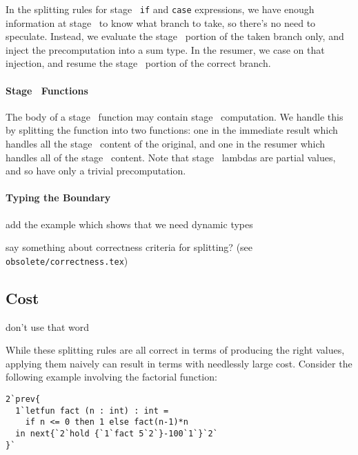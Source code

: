 In the splitting rules for stage \bbone\ {\tt if} and {\tt case} expressions, we
have enough information at stage \bbone\ to know what branch to take, so there's
no need to speculate. Instead, we evaluate the stage \bbone\ portion of the
taken branch only, and inject the precomputation into a sum type. In the
resumer, we case on that injection, and resume the stage \bbtwo\ portion of the
correct branch.

\paragraph {Stage \bbone\ Functions}

The body of a stage \bbone\ function may contain stage \bbtwo\ computation. We
handle this by splitting the function into two functions: one in the immediate
result which handles all the stage \bbone\ content of the original, and one in
the resumer which handles all of the stage \bbtwo\ content. Note that stage
\bbone\ lambdas are partial values, and so have only a trivial precomputation.

\paragraph {Typing the Boundary}

\TODO add the example which shows that we need dynamic types



\TODO say something about correctness criteria for splitting? (see
\texttt{obsolete/correctness.tex})

\subsection{Cost}

\TODO don't use that word

While these splitting rules are all correct in terms of producing the right values, applying them naively can result in terms with needlessly large cost.  Consider the following example involving the factorial function:
\begin{lstlisting}
2`prev{
  1`letfun fact (n : int) : int = 
    if n <= 0 then 1 else fact(n-1)*n
  in next{`2`hold {`1`fact 5`2`}-100`1`}`2`
}`
\end{lstlisting}

